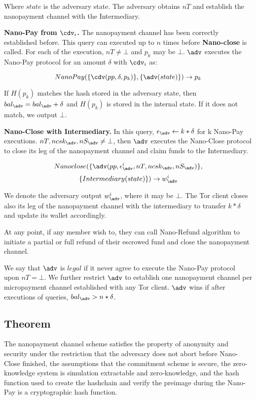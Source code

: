 Where $state$ is the adversary state. The adversary obtains $nT$ and establish the nanopayment channel with the Intermediary.

\textbf{Nano-Pay from $\cdv_i$.} The nanopayment channel has been correctly established before. This query can executed up to $n$ times before \textbf{Nano-close} is called. For each of the execution, $nT \neq \bot$ and $p_k$ may be $\bot$.  $\adv$ executes the Nano-Pay protocol for an amount $\delta$ with $\cdv_i$ as:

$$Nano\-Pay(\{\cdv(pp,\delta,p_k)\},\{\adv(state)\}) \rightarrow p_k$$

If $H(p_k)$ matches the hash stored in the adversary state, then $bal_\adv = bal_\adv+\delta$ and $H(p_k)$ is stored in the internal state. If it does not match, we output $\bot$.

\textbf{Nano-Close with Intermediary.} In this query, $\epsilon_\adv \leftarrow k*\delta$ for k Nano-Pay executions. $nT, ncsk_\adv, nS_\adv \neq \bot$, then $\adv$ executes the Nano-Close protocol to close its leg of the nanopayment channel and claim funds to the Intermediary. 

$$Nano\-close(\{\adv(pp, \epsilon^i_\adv, nT, ncsk_\adv, nS_\adv)\},$$
$$\{Intermediary(state)\}) \rightarrow w^i_\adv$$

We denote the adversary output $w^i_\adv$, where it may be $\bot$. The Tor client closes also its leg of the nanopayment channel with the intermediary to transfer $k*\delta$ and update its wallet accordingly.

At any point, if any member wish to, they can call Nano-Refund algorithm to initiate a partial or full refund of their escrowed fund and close the nanopayment channel.

We say that $\adv$ is $legal$ if it never agree to execute the Nano-Pay protocol upon $nT = \bot$. We further restrict $\adv$ to establish one nanopayment channel per micropayment channel established with any Tor client. $\adv$ wins if after executions of queries, $bal_\adv > n*\delta$.

\subsection{Theorem}
The nanopayment channel scheme satisfies the property of anonymity and security under the restriction that the adversary does not abort before Nano-Close finished, the assumptions that the commitment scheme is secure, the zero-knowledge system is simulation extractable and zero-knowledge, and the hash function used to create the hashchain and verify the preimage during the Nano-Pay is a cryptographic hash function.

